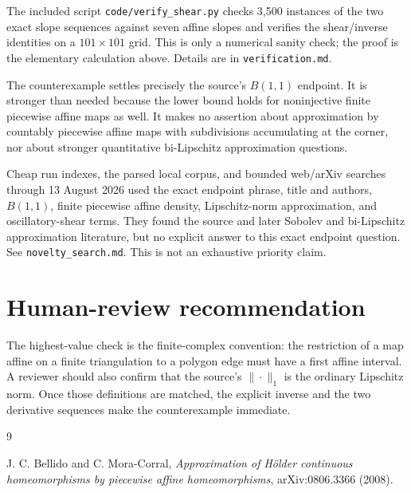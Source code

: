 \documentclass[10pt]{article}
\begin{document}
The included script \texttt{code/verify\_shear.py} checks 3,500 instances of
the two exact slope sequences against seven affine slopes and verifies the
shear/inverse identities on a $101\times101$ grid.  This is only a numerical
sanity check; the proof is the elementary calculation above.  Details are in
\texttt{verification.md}.

The counterexample settles precisely the source's $B(1,1)$ endpoint.  It is
stronger than needed because the lower bound holds for noninjective finite
piecewise affine maps as well.  It makes no assertion about approximation by
countably piecewise affine maps with subdivisions accumulating at the corner,
nor about stronger quantitative bi-Lipschitz approximation questions.

Cheap run indexes, the parsed local corpus, and bounded web/arXiv searches
through 13 August 2026 used the exact endpoint phrase, title and authors,
$B(1,1)$, finite piecewise affine density, Lipschitz-norm approximation, and
oscillatory-shear terms.  They found the source and later Sobolev and
bi-Lipschitz approximation literature, but no explicit answer to this exact
endpoint question.  See \texttt{novelty\_search.md}.  This is not an
exhaustive priority claim.

\section{Human-review recommendation}

The highest-value check is the finite-complex convention: the restriction of
a map affine on a finite triangulation to a polygon edge must have a first
affine interval.  A reviewer should also confirm that the source's
$\|\cdot\|_1$ is the ordinary Lipschitz norm.  Once those definitions are
matched, the explicit inverse and the two derivative sequences make the
counterexample immediate.

\begin{thebibliography}{9}

J. C. Bellido and C. Mora-Corral,
\emph{Approximation of H\"older continuous homeomorphisms by piecewise affine
homeomorphisms}, arXiv:0806.3366 (2008).

\end{thebibliography}
\end{document}

